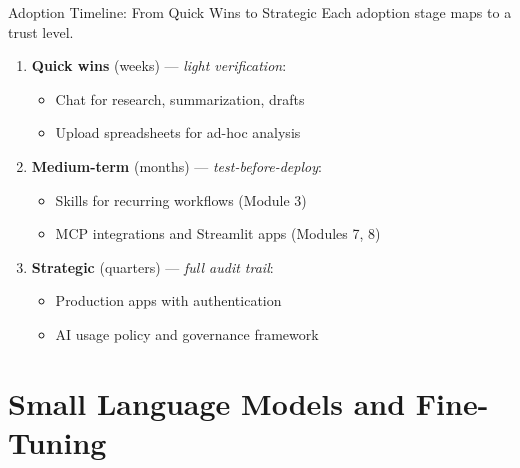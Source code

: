 \documentclass[aspectratio=169]{beamer}
\begin{document}
\begin{frame}{Adoption Timeline: From Quick Wins to Strategic}
Each adoption stage maps to a trust level.
\vspace{0.3cm}
\begin{enumerate}
  \item \textbf{Quick wins} (weeks) --- \textit{light verification}:
  \begin{itemize}\small
    \item Chat for research, summarization, drafts
    \item Upload spreadsheets for ad-hoc analysis
  \end{itemize}
  \item \textbf{Medium-term} (months) --- \textit{test-before-deploy}:
  \begin{itemize}\small
    \item Skills for recurring workflows (Module 3)
    \item MCP integrations and Streamlit apps (Modules 7, 8)
  \end{itemize}
  \item \textbf{Strategic} (quarters) --- \textit{full audit trail}:
  \begin{itemize}\small
    \item Production apps with authentication
    \item AI usage policy and governance framework
  \end{itemize}
\end{enumerate}
\end{frame}

\section{Small Language Models and Fine-Tuning}
\end{document}
